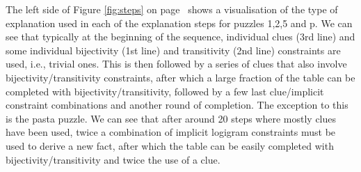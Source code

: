The left side of Figure \ref{fig:steps} on page~\pageref{fig:steps} shows a visualisation of the type of explanation used in each of the explanation steps for puzzles 1,2,5 and p. 
We can see that typically at the beginning of the sequence, individual clues (3rd line) and some individual bijectivity (1st line) and transitivity (2nd line) constraints are used, i.e., trivial ones.
This is then followed by a series of clues that also involve bijectivity/transitivity constraints, after which a large fraction of the table can be completed with bijectivity/transitivity, followed by a few last clue/implicit constraint combinations and another round of completion.
The exception to this is the pasta puzzle.
We can see that after around 20 steps where mostly clues have been used, twice a combination of implicit logigram constraints must be used to derive a new fact, after which the table can be easily completed with bijectivity/transitivity and twice the use of a clue.


